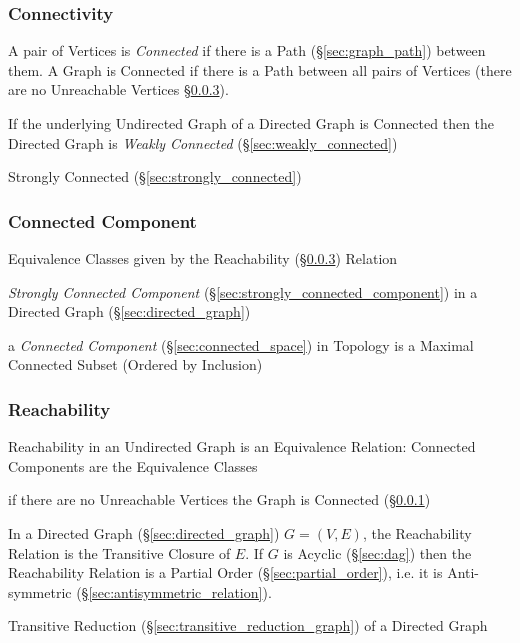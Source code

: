 \subsubsection{Connectivity}\label{sec:connectivity}

A pair of Vertices is \emph{Connected} if there is a Path
(\S\ref{sec:graph_path}) between them. A Graph is Connected if there
is a Path between all pairs of Vertices (there are no Unreachable
Vertices \S\ref{sec:reachability}).

If the underlying Undirected Graph of a Directed Graph is Connected
then the Directed Graph is \emph{Weakly Connected}
(\S\ref{sec:weakly_connected})

Strongly Connected (\S\ref{sec:strongly_connected})



\subsubsection{Connected Component}\label{sec:connected_component}

Equivalence Classes given by the Reachability
(\S\ref{sec:reachability}) Relation

\emph{Strongly Connected Component}
(\S\ref{sec:strongly_connected_component}) in a Directed Graph
(\S\ref{sec:directed_graph})

\fist a \emph{Connected Component} (\S\ref{sec:connected_space}) in Topology is
a Maximal Connected Subset (Ordered by Inclusion)



\subsubsection{Reachability}\label{sec:reachability}

Reachability in an Undirected Graph is an Equivalence Relation:
Connected Components are the Equivalence Classes

if there are no Unreachable Vertices the Graph is Connected
(\S\ref{sec:connectivity})

In a Directed Graph (\S\ref{sec:directed_graph}) $G = (V,E)$, the
Reachability Relation is the Transitive Closure of $E$. If $G$ is
Acyclic (\S\ref{sec:dag}) then the Reachability Relation is a Partial
Order (\S\ref{sec:partial_order}), i.e. it is Anti-symmetric
(\S\ref{sec:antisymmetric_relation}).

Transitive Reduction (\S\ref{sec:transitive_reduction_graph}) of a
Directed Graph



